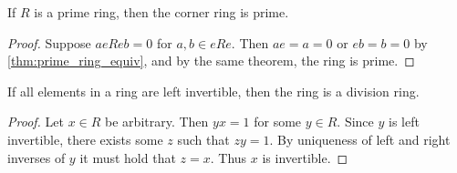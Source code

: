 \begin{theorem}
  \label{thm:corner_ring_prime}
  \leanok
  If $R$ is a prime ring, then the corner ring is prime.
\end{theorem}
\begin{proof}
  \leanok
  Suppose $aeReb = 0$ for $a, b \in eRe$. Then $ae = a = 0$ or $eb = b = 0$ by \ref{thm:prime_ring_equiv}, and by the same theorem, the ring is prime.
\end{proof}

\begin{theorem}
  \label{thm:all_left_inv_div_ring}
  \leanok
  If all elements in a ring are left invertible, then the ring is a division ring.
\end{theorem}
\begin{proof}
  \leanok
  Let $x \in R$ be arbitrary. Then $yx = 1$ for some $y \in R$. Since $y$ is left invertible, there exists some $z$ such that $zy = 1$. By uniqueness of left and right inverses of $y$ it must hold that $z = x$. Thus $x$ is invertible.
\end{proof}

